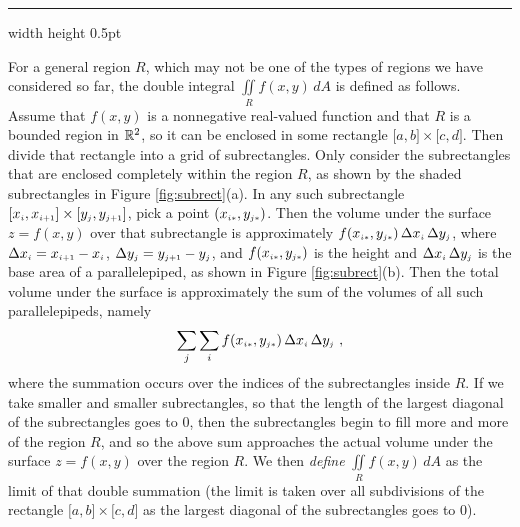 \hrule width \textwidth height 0.5pt
\medskip

For a general region $R$, which may not be one of the types of regions we have considered so far, the double integral
$\iint\limits_{R} f(x,y)\,dA$ is defined as follows. Assume that $f(x,y)$ is a nonnegative real-valued function
and that $R$ is a bounded region in $\mathbb{R}^{2}$, so it
can be enclosed in some rectangle $\lbrack a,b \rbrack \times \lbrack c,d \rbrack$. 
Then divide that rectangle
into a grid of subrectangles. 
Only consider the subrectangles that are enclosed completely within the region $R$, as
shown by the shaded subrectangles in Figure \ref{fig:subrect}(a). In any such subrectangle
$\lbrack x_{\scriptscriptstyle i},x_{\scriptscriptstyle i+1} \rbrack \times \lbrack y_{\scriptscriptstyle j},y_{\scriptscriptstyle j+1} \rbrack$, pick a point
$(x_{\scriptscriptstyle i*},y_{\scriptscriptstyle j*})$. Then the volume under the surface $z=f(x,y)$ over that subrectangle is approximately
$f(x_{\scriptscriptstyle i*},y_{\scriptscriptstyle j*})\,\Delta x_{\scriptscriptstyle i} \,\Delta y_{\scriptscriptstyle j}$, where $\Delta x_{\scriptscriptstyle i} = x_{\scriptscriptstyle i+1} -
x_{\scriptscriptstyle i}$, $\Delta y_{\scriptscriptstyle j} = y_{\scriptscriptstyle j+1} - y_{\scriptscriptstyle j}$, and $f(x_{\scriptscriptstyle i*},y_{\scriptscriptstyle j*})$ is the height
and $\Delta x_{\scriptscriptstyle i} \,\Delta y_{\scriptscriptstyle j}$ is the base area of a parallelepiped, as shown in Figure
\ref{fig:subrect}(b). Then the total volume under the surface is approximately the sum of the volumes of all such
parallelepipeds, namely
\begin{equation}\label{eqn:approxvol}
 \sum_j \sum_i f(x_{\scriptscriptstyle i*},y_{\scriptscriptstyle j*})\,\Delta x_{\scriptscriptstyle i} \,\Delta y_{\scriptscriptstyle j} ~,
\end{equation}
where the summation occurs over the indices of the subrectangles inside $R$. If we take smaller and smaller
subrectangles, so that the length of the largest diagonal of the subrectangles goes to $0$, then the subrectangles
begin to fill more and more of the region $R$, and so the above sum approaches
the actual volume under the surface $z=f(x,y)$ over the region $R$. We then \emph{define}
$\iint\limits_{R} f(x,y)\,dA$ as the limit of that double summation (the limit is taken over all subdivisions of the
rectangle $\lbrack a,b \rbrack \times \lbrack c,d \rbrack$ as the largest diagonal of the subrectangles goes to $0$).


